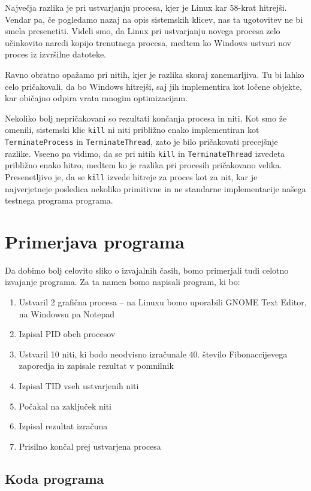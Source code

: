 \documentclass[a4paper,12pt,openright]{book}
\begin{document}
Največja razlika je pri ustvarjanju procesa, kjer je Linux kar 58-krat hitrejši.
Vendar pa, če pogledamo nazaj na opis sistemskih klicev, nas ta ugotovitev ne bi smela presenetiti.
Videli smo, da Linux pri ustvarjanju novega procesa zelo učinkovito naredi kopijo trenutnega procesa, medtem ko Windows ustvari nov proces iz izvršilne datoteke.

Ravno obratno opažamo pri nitih, kjer je razlika skoraj zanemarljiva.
Tu bi lahko celo pričakovali, da bo Windows hitrejši, saj jih implementira kot ločene objekte, kar običajno odpira vrata mnogim optimizacijam.

Nekoliko bolj nepričakovani so rezultati končanja procesa in niti.
Kot smo že omenili, sistemski klic \texttt{kill} ni niti približno enako implementiran kot \texttt{TerminateProcess} in \texttt{TerminateThread}, zato je bilo pričakovati precejšnje razlike.
Vseeno pa vidimo, da se pri nitih \texttt{kill} in \texttt{TerminateThread} izvedeta približno enako hitro, medtem ko je razlika pri procesih pričakovano velika.
Presenetljivo je, da se \texttt{kill} izvede hitreje za proces kot za nit, kar je najverjetneje posledica nekoliko primitivne in ne standarne implementacije našega testnega programa programa.

\section{Primerjava programa}

Da dobimo bolj celovito sliko o izvajalnih časih, bomo primerjali tudi celotno izvajanje programa.
Za ta namen bomo napisali program, ki bo:
\begin{enumerate}
	\item Ustvaril 2 grafična procesa -- na Linuxu bomo uporabili GNOME Text Editor, na Windowsu pa Notepad
	\item Izpisal PID obeh procesov
	\item Ustvaril 10 niti, ki bodo neodvisno izračunale 40. število Fibonaccijevega zaporedja in zapisale rezultat v pomnilnik
	\item Izpisal TID vseh ustvarjenih niti
	\item Počakal na zaključek niti
	\item Izpisal rezultat izračuna
	\item Prisilno končal prej ustvarjena procesa
\end{enumerate}

\subsection{Koda programa}
\end{document}
